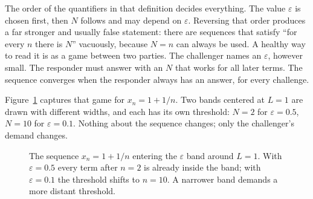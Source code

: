 The order of the quantifiers in that definition decides everything. The value
$\varepsilon$ is chosen first, then $N$ follows and may depend on $\varepsilon$.
Reversing that order produces a far stronger and usually false statement: there are
sequences that satisfy ``for every $n$ there is $N$'' vacuously, because $N=n$ can
always be used. A healthy way to read it is as a game between two parties. The
challenger names an $\varepsilon$, however small. The responder must answer with an
$N$ that works for all later terms. The sequence converges when the responder
always has an answer, for every challenge.

Figure~\ref{fig:pita-epsilon} captures that game for $x_n=1+1/n$. Two bands centered
at $L=1$ are drawn with different widths, and each has its own threshold: $N=2$ for
$\varepsilon=0.5$, $N=10$ for $\varepsilon=0.1$. Nothing about the sequence changes;
only the challenger's demand changes.

\begin{figure}[htbp]
\centering
{}
\caption{The sequence $x_n=1+1/n$ entering the $\varepsilon$ band around $L=1$. With
$\varepsilon=0.5$ every term after $n=2$ is already inside the band; with
$\varepsilon=0.1$ the threshold shifts to $n=10$. A narrower band demands a more
distant threshold.}
\label{fig:pita-epsilon}
\end{figure}


